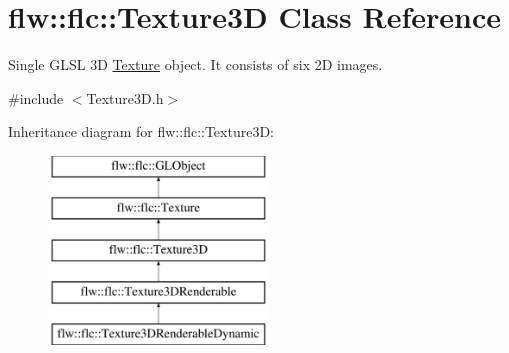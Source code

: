 \hypertarget{classflw_1_1flc_1_1Texture3D}{}\section{flw\+:\+:flc\+:\+:Texture3D Class Reference}
\label{classflw_1_1flc_1_1Texture3D}


Single G\+L\+SL 3D \hyperlink{classflw_1_1flc_1_1Texture}{Texture} object. It consists of six 2D images.  




{\ttfamily \#include $<$Texture3\+D.\+h$>$}

Inheritance diagram for flw\+:\+:flc\+:\+:Texture3D\+:\begin{figure}[H]
\begin{center}
\leavevmode
\includegraphics[height=5.000000cm]{classflw_1_1flc_1_1Texture3D}
\end{center}
\end{figure}
